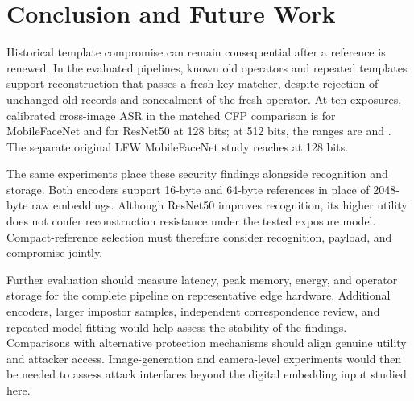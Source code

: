 \section{Conclusion and Future Work}\label{sec:conclusion}
Historical template compromise can remain consequential after a reference is renewed. In the evaluated pipelines, known old operators and repeated templates support reconstruction that passes a fresh-key matcher, despite rejection of unchanged old records and concealment of the fresh operator. At ten exposures, calibrated cross-image ASR in the matched CFP comparison is \MbfSmallAsr{} for MobileFaceNet and \RnetSmallAsr{} for ResNet50 at 128 bits; at 512 bits, the ranges are \MbfLargeAsr{} and \RnetLargeAsr{}. The separate original LFW MobileFaceNet study reaches \LfwBaselineAsr{} at 128 bits.

The same experiments place these security findings alongside recognition and storage. Both encoders support 16-byte and 64-byte references in place of 2048-byte raw embeddings. Although ResNet50 improves recognition, its higher utility does not confer reconstruction resistance under the tested exposure model. Compact-reference selection must therefore consider recognition, payload, and compromise jointly.

Further evaluation should measure latency, peak memory, energy, and operator storage for the complete pipeline on representative edge hardware. Additional encoders, larger impostor samples, independent correspondence review, and repeated model fitting would help assess the stability of the findings. Comparisons with alternative protection mechanisms should align genuine utility and attacker access. Image-generation and camera-level experiments would then be needed to assess attack interfaces beyond the digital embedding input studied here.